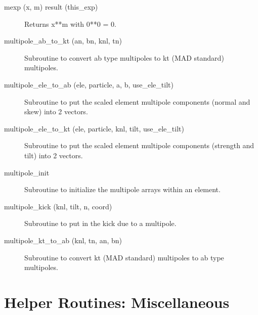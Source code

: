 \begin{description}

\item[mexp (x, m) result (this_exp)] \Newline 
Returns x**m with 0**0 = 0.

\item[multipole_ab_to_kt (an, bn, knl, tn)] \Newline
Subroutine to convert ab type multipoles to kt (MAD standard) multipoles. 

\item[multipole_ele_to_ab (ele, particle, a, b, use_ele_tilt)] \Newline
Subroutine to put the scaled element multipole components (normal and skew) into 2 vectors. 

\item[multipole_ele_to_kt (ele, particle, knl, tilt, use_ele_tilt)] \Newline
Subroutine to put the scaled element multipole components (strength and tilt) 
into 2 vectors. 

\item[multipole_init] \Newline
Subroutine to initialize the multipole arrays within an element.

\item[multipole_kick (knl, tilt, n, coord)] \Newline
Subroutine to put in the kick due to a multipole. 

\item[multipole_kt_to_ab (knl, tn, an, bn)] \Newline
Subroutine to convert kt (MAD standard) multipoles to ab type multipoles. 

\end{description}

\section{Helper Routines: Miscellaneous}
\label{r:misc_help}

